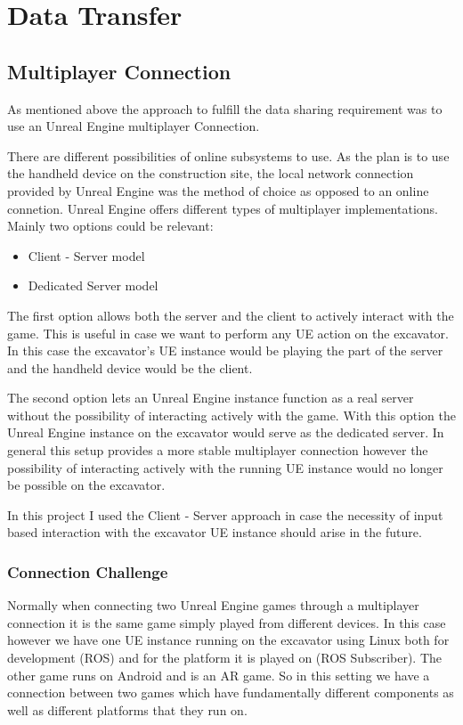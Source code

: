\chapter{Data Transfer}\label{ch:data_transfer}

\section{Multiplayer Connection}\label{sec:multiplayer}

As mentioned above the approach to fulfill the data sharing requirement was to use an Unreal Engine multiplayer Connection.

There are different possibilities of online subsystems to use. As the plan is to use the handheld device on the construction site, the local network connection provided by Unreal Engine was the method of choice as opposed to an online connetion. Unreal Engine offers different types of multiplayer implementations. Mainly two options could be relevant:
\begin{itemize}
    \item Client - Server model
    \item Dedicated Server model
\end{itemize}

The first option allows both the server and the client to actively interact with the game. This is useful in case we want to perform any UE action on the excavator. In this case the excavator's UE instance would be playing the part of the server and the handheld device would be the client. 

The second option lets an Unreal Engine instance function as a real server without the possibility of interacting actively with the game. With this option the Unreal Engine instance on the excavator would serve as the dedicated server. In general this setup provides a more stable multiplayer connection however the possibility of interacting actively with the running UE instance would no longer be possible on the excavator.

In this project I used the Client - Server approach in case the necessity of input based interaction with the excavator UE instance should arise in the future.

\subsection{Connection Challenge}\label{subsec:key}

Normally when connecting two Unreal Engine games through a multiplayer connection it is the same game simply played from different devices. In this case however we have one UE instance running on the excavator using Linux both for development (ROS) and for the platform it is played on (ROS Subscriber). The other game runs on Android and is an AR game. So in this setting we have a connection between two games which have fundamentally different components as well as different platforms that they run on. 

